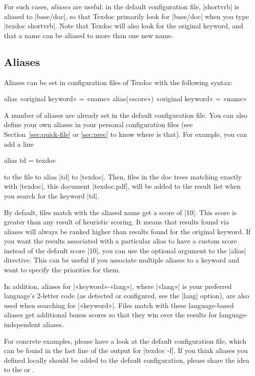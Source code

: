 \documentclass[draft]{texdoc-doc}
\begin{document}
For such cases, \emph{aliases} are useful: in the default configuration file,
|shortvrb| is aliased to |base/doc|, so that Texdoc primarily look for
|base/doc| when you type |texdoc shortvrb|. Note that Texdoc will also look for
the original keyword, and that a name can be aliased to more than one new
name.

\subsection{Aliases}
\label{sec:alias}

Aliases can be set in configuration files of Texdoc with the following syntax:
%
\begin{htcode}
alias «original keyword» = «name»
alias(«score») «original keyword» = «name»
\end{htcode}
%
A number of aliases are already set in the default configuration file. You can
also define your own aliases in your personal configuration files (see
Section~\ref{sec:quick-file} or \ref{sec:prec} to know where is that). For example,
you can add a line
%
\begin{htcode}
alias td = texdoc
\end{htcode}
%
to the file to alias |td| to |texdoc|. Then, files in the doc trees matching
exactly with |texdoc|, \ie this document |texdoc.pdf|, will be added to the
result list when you search for the keyword |td|.

By default, files match with the aliased name get a score of |10|. This score
is greater than any result of heuristic scoring. It means that results found
via aliases will always be ranked higher than results found for the original
keyword. If you want the results associated with a particular alias to have a
custom score instead of the default score |10|, you can use the optional
argument to the |alias| directive. This can be useful if you associate multiple
aliases to a keyword and want to specify the priorities for them.

In addition, aliases for |«keyword»-«lang»|, where |«lang»| is your preferred
language's 2-letter code (as detected or configured, see the |lang| option), are
also used when searching for |«keyword»|. Files match with these language-based
aliases get additional bonus scores so that they win over the results for
language-independent aliases.

For concrete examples, please have a look at the default configuration file,
which can be found in the last line of the output for |texdoc -f|. If you think
aliases you defined locally should be added to the default configuration,
please share the idea to the {\TexdocML} or {\TexdocRepo}.
\end{document}
